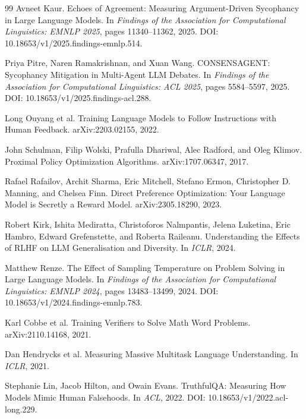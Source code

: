 \documentclass[sigconf,nonacm]{acmart}
\begin{document}
\begin{thebibliography}{99}
Avneet Kaur.
\newblock Echoes of Agreement: Measuring Argument-Driven Sycophancy in Large Language Models.
\newblock In \emph{Findings of the Association for Computational Linguistics: EMNLP 2025}, pages 11340--11362, 2025.
\newblock DOI: 10.18653/v1/2025.findings-emnlp.514.

Priya Pitre, Naren Ramakrishnan, and Xuan Wang.
\newblock CONSENSAGENT: Sycophancy Mitigation in Multi-Agent LLM Debates.
\newblock In \emph{Findings of the Association for Computational Linguistics: ACL 2025}, pages 5584--5597, 2025.
\newblock DOI: 10.18653/v1/2025.findings-acl.288.

Long Ouyang et al.
\newblock Training Language Models to Follow Instructions with Human Feedback.
\newblock arXiv:2203.02155, 2022.

John Schulman, Filip Wolski, Prafulla Dhariwal, Alec Radford, and Oleg Klimov.
\newblock Proximal Policy Optimization Algorithms.
\newblock arXiv:1707.06347, 2017.

Rafael Rafailov, Archit Sharma, Eric Mitchell, Stefano Ermon, Christopher D. Manning, and Chelsea Finn.
\newblock Direct Preference Optimization: Your Language Model is Secretly a Reward Model.
\newblock arXiv:2305.18290, 2023.

Robert Kirk, Ishita Mediratta, Christoforos Nalmpantis, Jelena Luketina, Eric Hambro, Edward Grefenstette, and Roberta Raileanu.
\newblock Understanding the Effects of RLHF on LLM Generalisation and Diversity.
\newblock In \emph{ICLR}, 2024.

Matthew Renze.
\newblock The Effect of Sampling Temperature on Problem Solving in Large Language Models.
\newblock In \emph{Findings of the Association for Computational Linguistics: EMNLP 2024}, pages 13483--13499, 2024.
\newblock DOI: 10.18653/v1/2024.findings-emnlp.783.

Karl Cobbe et al.
\newblock Training Verifiers to Solve Math Word Problems.
\newblock arXiv:2110.14168, 2021.

Dan Hendrycks et al.
\newblock Measuring Massive Multitask Language Understanding.
\newblock In \emph{ICLR}, 2021.

Stephanie Lin, Jacob Hilton, and Owain Evans.
\newblock TruthfulQA: Measuring How Models Mimic Human Falsehoods.
\newblock In \emph{ACL}, 2022.
\newblock DOI: 10.18653/v1/2022.acl-long.229.


\end{thebibliography}
\end{document}
